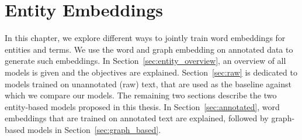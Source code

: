 \chapter{Entity Embeddings}\label{chap:entity}

In this chapter, we explore different ways to jointly train word embeddings for entities and terms. We use the word and graph embedding on annotated data to generate such embeddings. In Section~\ref{sec:entity_overview}, an overview of all models is given and the objectives are explained. Section~\ref{sec:raw} is dedicated to models trained on unannotated (raw) text, that are used as the baseline against which we compare our models. The remaining two sections describe the two entity-based models proposed in this thesis. In Section~\ref{sec:annotated}, word embeddings that are trained on annotated text are explained, followed by graph-based models in Section~\ref{sec:graph_based}.

